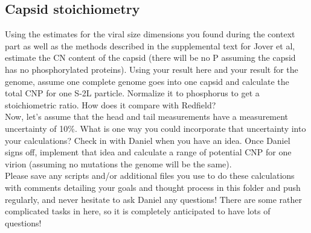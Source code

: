 \documentclass[11pt]{amsart}
\begin{document}
\subsection{Capsid stoichiometry} 
Using the estimates for the viral size dimensions you found during the context part as well as the methods described in the supplemental text for Jover et al, estimate the CN content of the capsid (there will be no P assuming the capsid has no phosphorylated proteins). Using your result here and your result for the genome, assume one complete genome goes into one capsid and calculate the total CNP for one S-2L particle. Normalize it to phosphorus to get a stoichiometric ratio. How does it compare with Redfield? \\
Now, let's assume that the head and tail measurements have a measurement uncertainty of 10\%. What is one way you could incorporate that uncertainty into your calculations? Check in with Daniel when you have an idea. Once Daniel signs off, implement that idea and calculate a range of potential CNP for one virion (assuming no mutations the genome will be the same). \\
Please save any scripts and/or additional files you use to do these calculations with comments detailing your goals and thought process in this folder and push regularly, and never hesitate to ask Daniel any questions! There are some rather complicated tasks in here, so it is completely anticipated to have lots of questions! 
\end{document}
